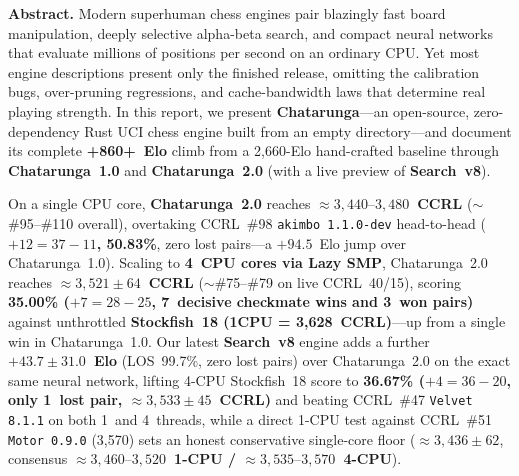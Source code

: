 \documentclass[10.5pt,letterpaper]{article}
\begin{document}
\begin{abstractbox}
\textbf{\color{dmnavy}Abstract.}\;
Modern superhuman chess engines pair blazingly fast board manipulation, deeply selective alpha-beta search, and compact neural networks that evaluate millions of positions per second on an ordinary CPU. Yet most engine descriptions present only the finished release, omitting the calibration bugs, over-pruning regressions, and cache-bandwidth laws that determine real playing strength. In this report, we present \textbf{Chatarunga}---an open-source, zero-dependency Rust UCI chess engine built from an empty directory---and document its complete \textbf{+860+~Elo} climb from a 2,660-Elo hand-crafted baseline through \textbf{Chatarunga~1.0} and \textbf{Chatarunga~2.0} (with a live preview of \textbf{Search~v8}).

On a single CPU core, \textbf{Chatarunga~2.0} reaches \textbf{$\approx 3{,}440\text{--}3{,}480$~CCRL} ($\sim$\#95--\#110 overall), overtaking CCRL~\#98 \texttt{akimbo 1.1.0-dev} head-to-head (\textbf{$+12 =37 -11$, 50.83\%}, zero lost pairs---a $+94.5$~Elo jump over Chatarunga~1.0). Scaling to \textbf{4~CPU cores via Lazy SMP}, Chatarunga~2.0 reaches \textbf{$\approx 3{,}521 \pm 64$~CCRL} ($\sim$\#75--\#79 on live CCRL~40/15), scoring \textbf{35.00\% ($+7 =28 -25$, 7~decisive checkmate wins and 3~won pairs)} against unthrottled \textbf{Stockfish~18 (1CPU = 3,628~CCRL)}---up from a single win in Chatarunga~1.0. Our latest \textbf{Search~v8} engine adds a further \textbf{$+43.7 \pm 31.0$~Elo} (LOS~99.7\%, zero lost pairs) over Chatarunga~2.0 on the exact same neural network, lifting 4-CPU Stockfish~18 score to \textbf{36.67\% ($+4 =36 -20$, only 1~lost pair, $\approx 3{,}533 \pm 45$~CCRL)} and beating CCRL~\#47 \texttt{Velvet 8.1.1} on both 1~and 4~threads, while a direct 1-CPU test against CCRL~\#51 \texttt{Motor 0.9.0} (3,570) sets an honest conservative single-core floor ($\approx 3{,}436 \pm 62$, consensus \textbf{$\approx 3{,}460\text{--}3{,}520$~1-CPU / $\approx 3{,}535\text{--}3{,}570$~4-CPU}).


\end{abstractbox}
\end{document}
